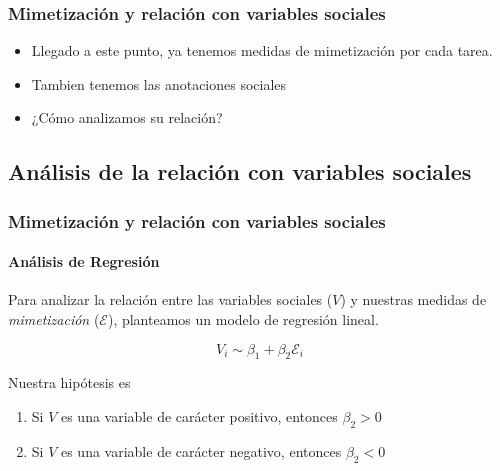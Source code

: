 \begin{frame}
  \frametitle{Mimetización y relación con variables   sociales}

  \begin{itemize}
    \item Llegado a este punto, ya tenemos medidas de mimetización por cada tarea.
    \item Tambien tenemos las anotaciones sociales
    \item ¿Cómo analizamos su relación?
  \end{itemize}

\end{frame}
\subsection{Análisis de la relación con variables sociales}

\begin{frame}
\frametitle{Mimetización y relación con variables sociales}
  \framesubtitle{Análisis de Regresión}

  Para analizar la relación entre las variables sociales ($V$) y nuestras medidas de \emph{mimetización} ($\mathcal{E}$), planteamos un modelo de regresión lineal.

    \begin{equation}
      V_i \sim \beta_1 + \beta_2 \mathcal{E}_i
    \end{equation}

  Nuestra hipótesis es

  \begin{enumerate}
    \item Si $V$ es una variable de carácter positivo, entonces $\beta_2 > 0$
    \item Si $V$ es una variable de carácter negativo, entonces $\beta_2 < 0$
  \end{enumerate}
\end{frame}
